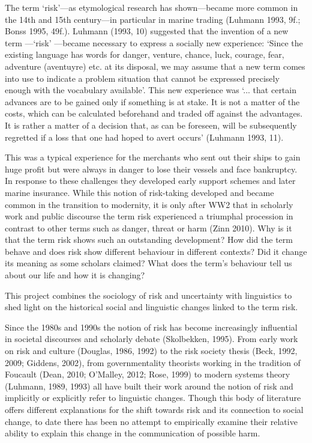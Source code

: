 The term `risk'---as etymological research has shown---became more common in the 14th and 15th century---in particular in marine trading (Luhmann 1993, 9f.; Bonss 1995, 49f.). Luhmann (1993, 10) suggested that the invention of a new term ---`risk' ---became necessary to express a socially new experience: `Since the existing language has words for danger, venture, chance, luck, courage, fear, adventure (aventuyre) etc. at its disposal, we may assume that a new term comes into use to indicate a problem situation that cannot be expressed precisely enough with the vocabulary available'. This new experience was `... that certain advances are to be gained only if something is at stake. It is not a matter of the costs, which can be calculated beforehand and traded off against the advantages. It is rather a matter of a decision that, as can be foreseen, will be subsequently regretted if a loss that one had hoped to avert occurs' (Luhmann 1993, 11).

This was a typical experience for the merchants who sent out their ships to gain huge profit but were always in danger to lose their vessels and face bankruptcy. In response to these challenges they developed early support schemes and later marine insurance. While this notion of risk-taking developed and became common in the transition to modernity, it is only after WW2 that in scholarly work and public discourse the term risk experienced a triumphal procession in contrast to other terms such as danger, threat or harm (Zinn 2010). Why is it that the term risk shows such an outstanding development? How did the term behave and does risk show different behaviour in different contexts? Did it change its meaning as some scholars claimed? What does the term's behaviour tell us about our life and how it is changing?

This project combines the sociology of risk and uncertainty with linguistics to shed light on the historical social and linguistic changes linked to the term risk.

Since the 1980s and 1990s the notion of risk has become increasingly influential in societal discourses and scholarly debate (Skolbekken, 1995). From early work on risk and culture (Douglas, 1986, 1992) to the risk society thesis (Beck, 1992, 2009; Giddens, 2002), from governmentality theorists working in the tradition of Foucault (Dean, 2010; O'Malley, 2012; Rose, 1999) to modern systems theory (Luhmann, 1989, 1993) all have built their work around the notion of risk and implicitly or explicitly refer to linguistic changes. Though this body of literature offers different explanations for the shift towards risk and its connection to social change, to date there has been no attempt to empirically examine their relative ability to explain this change in the communication of possible harm.

